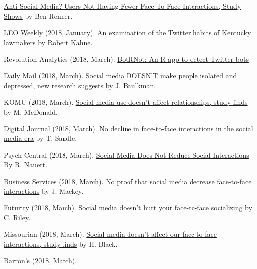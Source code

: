 \begin{bibenum}
      \href{https://www.studyfinds.org/social-media-not-decrease-face-face-interaction-study-says/}{Anti-Social Media? Users Not Having Fewer Face-To-Face Interactions, Study Shows} by Ben Renner.
    \item[] LEO Weekly (2018, January).
      \href{https://www.leoweekly.com/2018/01/kentucky-legislature-twitter-analysis/}{An examination of the Twitter habits of Kentucky lawmakers} by Robert Kahne.
    \item[] Revolution Analytics (2018, March).
      \href{http://blog.revolutionanalytics.com/2018/03/twitter-bot-or-not.html}{BotRNot: An R app to detect Twitter bots}
    \item[] Daily Mail (2018, March).
      \href{http://www.dailymail.co.uk/health/article-5455279/Facebook-does-NOT-decrease-social-interaction.html}{Social media DOESN'T make people isolated and depressed, new research suggests} by J. Baulkman.
    \item[] KOMU (2018, March).
      \href{http://www.komu.com/news/social-media-use-doesn-t-affect-relationships-study-finds}{Social media use doesn't affect relationships, study finds} by M. McDonald.
    \item[] Digital Journal (2018, March).
      \href{http://www.digitaljournal.com/tech-and-science/technology/no-decline-in-face-to-face-interactions-in-the-social-media-era/article/516359}{No decline in face-to-face interactions in the social media era} by T. Sandle.
    \item[] Psych Central (2018, March).
      \href{https://psychcentral.com/news/2018/03/02/social-media-does-not-reduce-social-interactions/133209.html}{Social Media Does Not Reduce Social Interactions} By R. Nauert.
    \item[] Business Services (2018, March).
      \href{http://businessservices24.com/44/no-proof-that-social-media-decrease-face-to-face-interactions/}{No proof that social media decrease face-to-face interactions} by J. Mackey.
    \item[] Futurity (2018, March).
      \href{http://www.futurity.org/social-media-social-interactions-1692872/}{Social media doesn’t hurt your face-to-face socializing} by C. Riley.
    \item[] Missourian (2018, March).
      \href{https://www.columbiamissourian.com/news/higher_education/social-media-doesn-t-affect-our-face-to-face-interactions/}{Social media doesn't affect our face-to-face interactions, study finds} by H. Black.
    \item[] Barron's (2018, March).

\end{bibenum}
